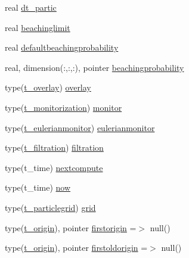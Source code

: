 \begin{DoxyCompactItemize}
\item 
real \mbox{\hyperlink{structmodulelagrangian_1_1t__lagrangian_a419a5e799f6223846a98387d458e0b85}{dt\+\_\+partic}}
\item 
real \mbox{\hyperlink{structmodulelagrangian_1_1t__lagrangian_a5dbd87a11a96acaa1842f70337bc7e25}{beachinglimit}}
\item 
real \mbox{\hyperlink{structmodulelagrangian_1_1t__lagrangian_a6042ece5dfabc266f7102d5883e7074a}{defaultbeachingprobability}}
\item 
real, dimension(\+:,\+:,\+:), pointer \mbox{\hyperlink{structmodulelagrangian_1_1t__lagrangian_ad1cd2682423fd564e1938a7f4a6e77d7}{beachingprobability}}
\item 
type(\mbox{\hyperlink{structmodulelagrangian_1_1t__overlay}{t\+\_\+overlay}}) \mbox{\hyperlink{structmodulelagrangian_1_1t__lagrangian_aeca6427a28c4966b62c233f35fd6d9b1}{overlay}}
\item 
type(\mbox{\hyperlink{structmodulelagrangian_1_1t__monitorization}{t\+\_\+monitorization}}) \mbox{\hyperlink{structmodulelagrangian_1_1t__lagrangian_afefc5acc78f6cb44808ff2d112db17e1}{monitor}}
\item 
type(\mbox{\hyperlink{structmodulelagrangian_1_1t__eulerianmonitor}{t\+\_\+eulerianmonitor}}) \mbox{\hyperlink{structmodulelagrangian_1_1t__lagrangian_a3f4f1f9dea4ee3d323b4dd568075900a}{eulerianmonitor}}
\item 
type(\mbox{\hyperlink{structmodulelagrangian_1_1t__filtration}{t\+\_\+filtration}}) \mbox{\hyperlink{structmodulelagrangian_1_1t__lagrangian_ad81cec396ea18a3be23bd5c0f65c90c4}{filtration}}
\item 
type(t\+\_\+time) \mbox{\hyperlink{structmodulelagrangian_1_1t__lagrangian_a20f2d6d31c10d32dc94ab7166bb372e8}{nextcompute}}
\item 
type(t\+\_\+time) \mbox{\hyperlink{structmodulelagrangian_1_1t__lagrangian_ae3155273817856f9f23d6e1134210518}{now}}
\item 
type(\mbox{\hyperlink{structmodulelagrangian_1_1t__particlegrid}{t\+\_\+particlegrid}}) \mbox{\hyperlink{structmodulelagrangian_1_1t__lagrangian_abff54f080cf54059eaccad756c0fd2ac}{grid}}
\item 
type(\mbox{\hyperlink{structmodulelagrangian_1_1t__origin}{t\+\_\+origin}}), pointer \mbox{\hyperlink{structmodulelagrangian_1_1t__lagrangian_a24419a749a55de42047ce2e351215c44}{firstorigin}} =$>$ null()
\item 
type(\mbox{\hyperlink{structmodulelagrangian_1_1t__origin}{t\+\_\+origin}}), pointer \mbox{\hyperlink{structmodulelagrangian_1_1t__lagrangian_ae34439a334caf58fea0e2bfcd6c31879}{firstoldorigin}} =$>$ null()

\end{DoxyCompactItemize}
